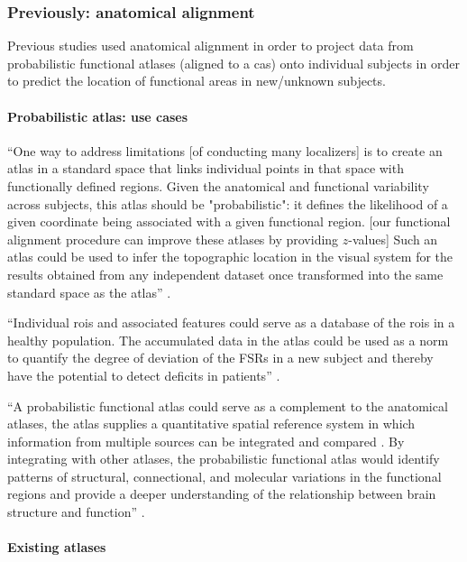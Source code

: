 \subsubsection{Previously: anatomical alignment}
%
Previous studies used anatomical alignment in order to project data from
probabilistic functional atlases (aligned to a \ac{cas}) onto individual
subjects in order to predict the location of functional areas in new/unknown
subjects.



\paragraph{Probabilistic atlas: use cases}
%
``One way to address limitations [of conducting many localizers] is to create an
atlas in a standard space that links individual points in that space with
functionally defined regions.
%
Given the anatomical and functional variability across subjects, this atlas
should be "probabilistic": it defines the likelihood of a given coordinate being
associated with a given functional region. [our functional alignment procedure
can improve these atlases by providing $z$-values]
%
Such an atlas could be used to infer the topographic location in the visual
system for the results obtained from any independent dataset once transformed
into the same standard space as the atlas'' \citep{wang2015probabilistic}.

%
``Individual \acp{roi} and associated features could serve as a database of the
\acp{roi} in a healthy population.
%
The accumulated data in the atlas could be used as a norm to quantify the degree
of deviation of the FSRs in a new subject and thereby have the potential to
detect deficits in patients'' \citep{zhen2015quantifying}.


%
``A probabilistic functional atlas could serve as a complement to the anatomical
atlases, the atlas supplies a quantitative spatial reference system in which
information from multiple sources can be integrated and compared
\citep{zhen2015quantifying}.
%
By integrating with other atlases, the probabilistic functional atlas would
identify patterns of structural, connectional, and molecular variations in the
functional regions and provide a deeper understanding of the relationship
between brain structure and function'' \citep{zhen2015quantifying}.


\paragraph{Existing atlases}

